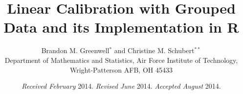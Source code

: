 \documentclass[useAMS,usenatbib,usegraphicx,referee]{biom}\usepackage[]{graphicx}\usepackage[]{color}
\title[Linear Calibration with Grouped Data]{Linear Calibration with Grouped Data and its Implementation in R}
\author{Brandon M. Greenwell$^{*}$\email{brandon.greenwell@afit.edu} and
Christine M. Schubert$^{**}$\email{christine.schubertkabban@afit.edu} \\
Department of Mathematics and Statistics, Air Force Institute of Technology, \\ Wright-Patterson AFB, OH 45433}
\begin{document}

\date{{\it Received February} 2014. {\it Revised June} 2014.  {\it
Accepted August} 2014.}



\pagerange{\pageref{firstpage}--\pageref{lastpage}} 




\label{firstpage}

\end{document}
